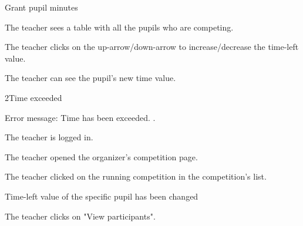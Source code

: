 \begin{uc}{Grant pupil minutes}

    \begin{uc-mss}
    \item The teacher sees a table with all the pupils who are competing.
    \item The teacher clicks on the up-arrow/down-arrow to increase/decrease the time-left value.
    \item The teacher can see the pupil's new time value.
    \end{uc-mss}

    \begin{uc-ext}

        \begin{uc-fail}{2}{Time exceeded}
        \item Error message: Time has been exceeded.
            .
        \end{uc-fail}

    \end{uc-ext}

    \begin{uc-pre}
        \item The teacher is logged in.
        \item The teacher opened the organizer's competition page.
    \item The teacher clicked on the running competition in the competition's list.
    \end{uc-pre}

    \begin{uc-post}
    \item Time-left value of the specific pupil has been changed
    \end{uc-post}

    \begin{uc-trig}
        The teacher clicks on "View participants".
    \end{uc-trig}

\end{uc}
